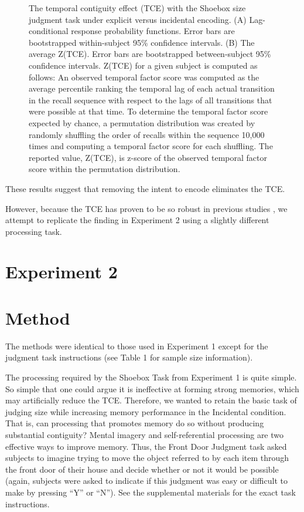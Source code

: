 \documentclass[jou,natbib,floatsintext]{apa6} %
\begin{document}
\newcommand\paneltext{(A) Lag-conditional response probability functions. Error bars are bootstrapped within-subject 95\% confidence intervals. (B) The average Z(TCE).  Error bars are bootstrapped between-subject 95\% confidence intervals. Z(TCE) for a given subject is computed as follows: An observed temporal factor score was computed as the average percentile ranking the temporal lag of each actual transition in the recall sequence with respect to the lags of all transitions that were possible at that time. To determine the temporal factor score expected by chance, a permutation distribution was created by randomly shuffling the order of recalls within the sequence 10,000 times and computing a temporal factor score for each shuffling. The reported value, Z(TCE), is z-score of the observed temporal factor score within the permutation distribution.}
\begin{figure*}
\caption{The temporal contiguity effect (TCE) with the Shoebox size judgment task under explicit versus incidental encoding. \paneltext}
\label{shoebox}
\end{figure*}

These results suggest that removing the intent to encode eliminates the TCE.

However, because the TCE has proven to be so robust in previous studies \citep{HealKaha17}, we attempt to replicate the finding in Experiment 2 using a slightly different processing task.

\section{Experiment 2}
\section{Method}

The methods were identical to those used in Experiment 1 except for the judgment task instructions (see Table 1 for sample size information).

The processing required by the Shoebox Task from Experiment 1 is quite simple. So simple that one could argue it is  ineffective at forming strong memories, which may artificially reduce the TCE. Therefore, we wanted to retain the basic task of judging size while increasing memory performance in the Incidental condition. That is, can processing that promotes memory do so without producing substantial contiguity? Mental imagery and self-referential processing are two effective ways to improve memory. Thus, the Front Door Judgment task asked subjects to imagine trying to move the object referred to by each item through the front door of their house and decide whether or not it would be possible (again, subjects were asked to indicate if this judgment was easy or difficult to make by pressing ``Y'' or ``N'').
See the supplemental materials for the exact task instructions.
\end{document}
